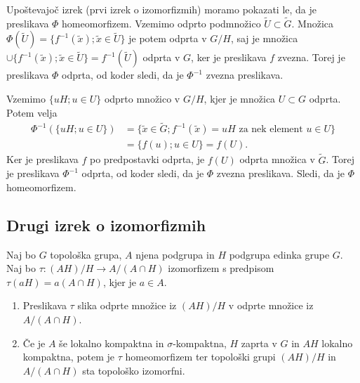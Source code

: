 \documentclass[mat1]{fmfdelo}
\begin{document}
\begin{dokaz}
Upoštevajoč izrek (prvi izrek o izomorfizmih) moramo pokazati le, da je preslikava $\Phi$ homeomorfizem. Vzemimo odprto podmnožico $\widetilde{U} \subset \widetilde{G}$. Množica $\Phi(\widetilde{U}) = \lbrace f^{-1}(\tilde{x}) ; \tilde{x} \in \widetilde{U} \rbrace$ je potem odprta v $G/H$, saj je množica $\cup\lbrace f^{-1}(\tilde{x}) ; \tilde{x} \in \widetilde{U} \rbrace = f^{-1}(\widetilde{U})$ odprta v $G$, ker je preslikava $f$ zvezna. Torej je preslikava $\Phi$ odprta, od koder sledi, da je $\Phi^{-1}$ zvezna preslikava.

Vzemimo $\lbrace uH ; u \in U \rbrace$ odprto množico v $G/H$, kjer je množica $U \subset G$ odprta. Potem velja
\begin{align*}
\Phi^{-1}(\lbrace uH ; u \in U \rbrace) &= \lbrace \tilde{x} \in \widetilde{G} ; f^{-1}(\tilde{x}) = uH \text{ za nek element } u \in U \rbrace \\
&= \lbrace f(u) ; u \in U \rbrace = f(U).
\end{align*}
Ker je preslikava $f$ po predpostavki odprta, je $f(U)$ odprta množica v $\widetilde{G}$. Torej je preslikava $\Phi^{-1}$ odprta, od koder sledi, da je $\Phi$ zvezna preslikava. Sledi, da je $\Phi$ homeomorfizem.
\end{dokaz}

\subsection{Drugi izrek o izomorfizmih}
\begin{izrek}\label{izr:drugitopizrek}
Naj bo $G$ topološka grupa, $A$ njena podgrupa in $H$ podgrupa edinka grupe $G$. Naj bo $\tau\colon (AH)/H \to A/(A \cap H)$ izomorfizem s predpisom $\tau (aH) = a(A \cap H)$, kjer je $a \in A$.
\begin{enumerate}
\item Preslikava $\tau$ slika odprte množice iz $(AH)/H$ v odprte množice iz $A/(A \cap H)$. \label{podtrd:ioi2-1}
\item Če je $A$ še lokalno kompaktna in $\sigma$-kompaktna, $H$ zaprta v $G$ in $AH$ lokalno kompaktna, potem je $\tau$ homeomorfizem ter topološki grupi $(AH)/H$ in $A/(A \cap H)$ sta topološko izomorfni. \label{podtrd:ioi2-2}
\end{enumerate}
\end{izrek}
\end{document}
